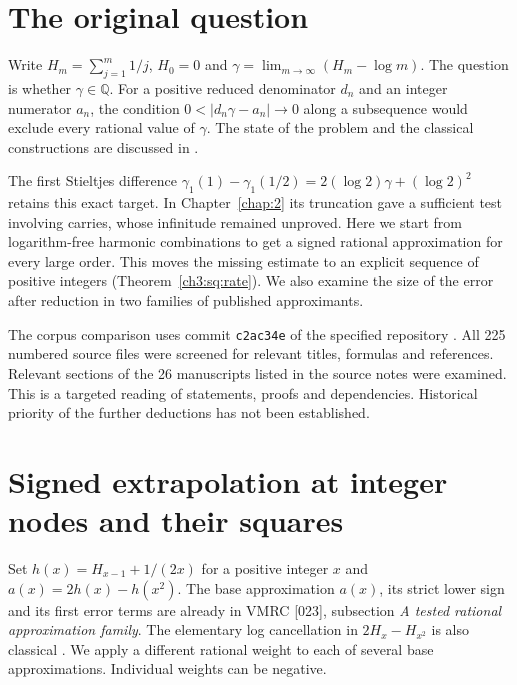 \documentclass[11pt,a4paper,oneside,openany]{report}
\theoremstyle{remark}\newtheorem{remark}[theorem]{Remark}
\numberwithin{equation}{section}
\begin{document}
\section{The original question}
Write $H_m=\sum_{j=1}^m 1/j$, $H_0=0$ and $\gamma=\lim_{m\to\infty}(H_m-\log m)$. The question is whether $\gamma\in\mathbb Q$. For a positive reduced denominator $d_n$ and an integer numerator $a_n$, the condition $0<|d_n\gamma-a_n|\to0$ along a subsequence would exclude every rational value of $\gamma$. The state of the problem and the classical constructions are discussed in \cite{lagarias,kalisch,sondow}.

The first Stieltjes difference $\gamma_1(1)-\gamma_1(1/2)=2(\log2)\gamma+(\log2)^2$ retains this exact target. In Chapter~\ref{chap:2} its truncation gave a sufficient test involving carries, whose infinitude remained unproved. Here we start from logarithm-free harmonic combinations to get a signed rational approximation for every large order. This moves the missing estimate to an explicit sequence of positive integers (Theorem~\ref{ch3:sq:rate}). We also examine the size of the error after reduction in two families of published approximants.

The corpus comparison uses commit \texttt{c2ac34e} of the specified repository \cite{corpus}. All 225 numbered source files were screened for relevant titles, formulas and references. Relevant sections of the 26 manuscripts listed in the source notes were examined. This is a targeted reading of statements, proofs and dependencies. Historical priority of the further deductions has not been established.

\section{Signed extrapolation at integer nodes and their squares}\label{ch3:sq:section}
Set $h(x)=H_{x-1}+1/(2x)$ for a positive integer $x$ and $a(x)=2h(x)-h(x^2)$. The base approximation $a(x)$, its strict lower sign and its first error terms are already in VMRC [023], subsection \emph{A tested rational approximation family}. The elementary log cancellation in $2H_x-H_{x^2}$ is also classical \cite{mueger}. We apply a different rational weight to each of several base approximations. Individual weights can be negative.
\end{document}
